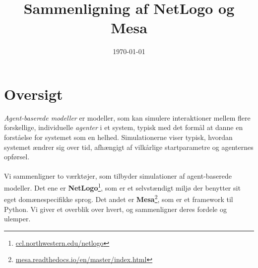 \documentclass{article}
\title{Sammenligning af NetLogo og Mesa}
\date{\today}
\begin{document}
\maketitle

\section{Oversigt}
\textit{Agent-baserede modeller} er modeller, som kan simulere interaktioner mellem flere forskellige, individuelle \textit{agenter} i et system, typisk med det formål at danne en forståelse for systemet som en helhed. Simulationerne viser typisk, hvordan systemet ændrer sig over tid, afhængigt af vilkårlige startparametre og agenternes opførsel.\\\\
Vi sammenligner to værktøjer, som tilbyder simulationer af agent-baserede modeller. Det ene er \textbf{NetLogo}\footnote{\url{ccl.northwestern.edu/netlogo}}, som er et selvstændigt miljø der benytter sit eget domænespecifikke sprog. Det andet er \textbf{Mesa}\footnote{\url{mesa.readthedocs.io/en/master/index.html}}, som er et framework til Python. Vi giver et overblik over hvert, og sammenligner deres fordele og ulemper.
\end{document}
